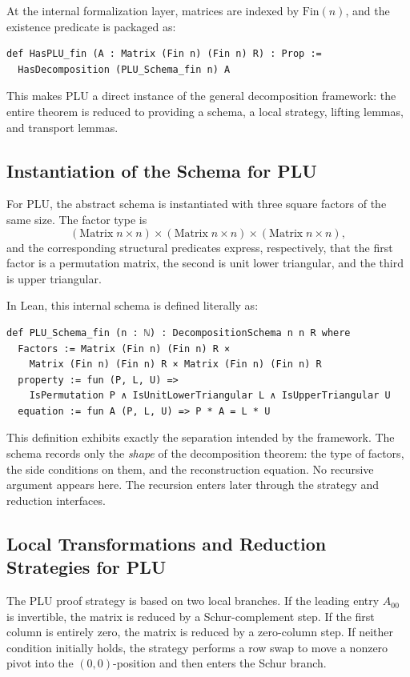\documentclass[pdflatex,sn-mathphys-num]{sn-jnl}%
\theoremstyle{thmstyleone}%
\theoremstyle{thmstyletwo}%
\theoremstyle{thmstylethree}%
\begin{document}
At the internal formalization layer, matrices are indexed by \(\mathrm{Fin}(n)\), and the existence predicate is packaged as:

\begin{lstlisting}
def HasPLU_fin (A : Matrix (Fin n) (Fin n) R) : Prop :=
  HasDecomposition (PLU_Schema_fin n) A
\end{lstlisting}

This makes PLU a direct instance of the general decomposition framework: the entire theorem is reduced to providing a schema, a local strategy, lifting lemmas, and transport lemmas.

\subsection{Instantiation of the Schema for PLU}
For PLU, the abstract schema is instantiated with three square factors of the same size.  The factor type is
\[
(\mathrm{Matrix}\; n \times n)\times(\mathrm{Matrix}\; n \times n)\times(\mathrm{Matrix}\; n \times n),
\]
and the corresponding structural predicates express, respectively, that the first factor is a permutation matrix, the second is unit lower triangular, and the third is upper triangular.

In Lean, this internal schema is defined literally as:

\begin{lstlisting}
def PLU_Schema_fin (n : ℕ) : DecompositionSchema n n R where
  Factors := Matrix (Fin n) (Fin n) R ×
    Matrix (Fin n) (Fin n) R × Matrix (Fin n) (Fin n) R
  property := fun (P, L, U) =>
    IsPermutation P ∧ IsUnitLowerTriangular L ∧ IsUpperTriangular U
  equation := fun A (P, L, U) => P * A = L * U
\end{lstlisting}

This definition exhibits exactly the separation intended by the framework.  The schema records only the \emph{shape} of the decomposition theorem: the type of factors, the side conditions on them, and the reconstruction equation.  No recursive argument appears here.  The recursion enters later through the strategy and reduction interfaces.

\subsection{Local Transformations and Reduction Strategies for PLU}
The PLU proof strategy is based on two local branches.  If the leading entry \(A_{00}\) is invertible, the matrix is reduced by a Schur-complement step.  If the first column is entirely zero, the matrix is reduced by a zero-column step.  If neither condition initially holds, the strategy performs a row swap to move a nonzero pivot into the \((0,0)\)-position and then enters the Schur branch.
\end{document}
